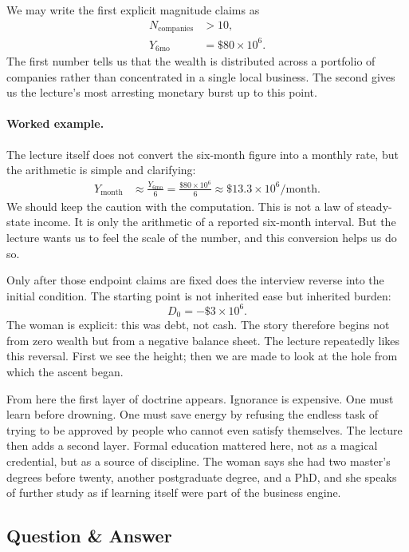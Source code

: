 We may write the first explicit magnitude claims as
\begin{align}
N_{\text{companies}} &> 10,\\
Y_{6\text{mo}} &= \$80 \times 10^6.
\end{align}
The first number tells us that the wealth is distributed across a portfolio of companies rather than concentrated in a single local business. The second gives us the lecture's most arresting monetary burst up to this point.

\paragraph{Worked example.}
The lecture itself does not convert the six-month figure into a monthly rate, but the arithmetic is simple and clarifying:
\begin{align}
Y_{\text{month}}
&\approx \frac{Y_{6\text{mo}}}{6}
= \frac{\$80 \times 10^6}{6}
\approx \$13.3 \times 10^6/\text{month}.
\end{align}
We should keep the caution with the computation. This is not a law of steady-state income. It is only the arithmetic of a reported six-month interval. But the lecture wants us to feel the scale of the number, and this conversion helps us do so.

Only after those endpoint claims are fixed does the interview reverse into the initial condition. The starting point is not inherited ease but inherited burden:
\begin{equation}
D_0 = -\$3 \times 10^6.
\end{equation}
The woman is explicit: this was debt, not cash. The story therefore begins not from zero wealth but from a negative balance sheet. The lecture repeatedly likes this reversal. First we see the height; then we are made to look at the hole from which the ascent began.

From here the first layer of doctrine appears. Ignorance is expensive. One must learn before drowning. One must save energy by refusing the endless task of trying to be approved by people who cannot even satisfy themselves. The lecture then adds a second layer. Formal education mattered here, not as a magical credential, but as a source of discipline. The woman says she had two master's degrees before twenty, another postgraduate degree, and a PhD, and she speaks of further study as if learning itself were part of the business engine.

\subsection{Question \& Answer}

